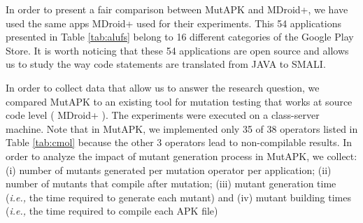 In order to present a fair comparison between MutAPK and MDroid+, we have used the same apps MDroid+ used for their experiments. This 54 applications presented in Table \ref{tab:alufs} belong to 16 different categories of the Google Play Store. It is worth noticing that these 54 applications are open source and allows us to study the way code statements are translated from JAVA to SMALI.

In order to collect data that allow us to answer the research question, we compared MutAPK to an existing tool for mutation testing that works at source code level ( MDroid+ \cite{linares2017enabling} ). 
The experiments were executed on a class-server machine. 
Note that in MutAPK, we implemented only 35 of 38 operators listed in Table \ref{tab:cmol} because the other 3 operators lead to non-compilable results. In order to analyze the impact of mutant generation process in MutAPK, we collect: (i) number of mutants generated per mutation operator per application; (ii) number of mutants that compile after mutation; (iii) mutant generation time (\textit{i.e.,} the time required to generate each mutant) and (iv) mutant building times (\textit{i.e.,} the time required to compile each APK file)
